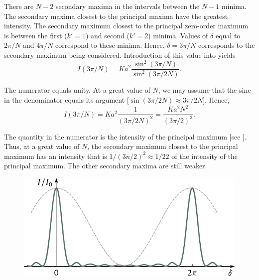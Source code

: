 \noindent
There are $N-2$ secondary maxima in the intervals between the $N-1$ minima.
The secondary maxima closest to the principal maxima have the greatest intensity.
The secondary maximum closest to the principal zero-order maximum is between the first ($k'=1$) and second ($k'=2$) minima.
Values of $\delta$ equal to $2\pi/N$ and $4\pi/N$ correspond to these minima.
Hence, $\delta=3\pi/N$ corresponds to the secondary maximum being considered.
Introduction of this value into  yields
\begin{equation*}
    I(3\pi/N) = K a^2 \frac{ \sin^2(3\pi/N) }{ \sin^2(3\pi/2N) }.
\end{equation*}

\noindent
The numerator equals unity.
At a great value of $N$, we may assume that the sine in the denominator equals its argument [$\sin(3\pi/2N)\approx 3\pi/2N$].
Hence,
\begin{equation*}
    I(3\pi/N) = K a^2 \frac{1}{ (3\pi/2N)^2 } = \frac{K a^2 N^2}{(3\pi/2)^2}.
\end{equation*}

\noindent
The quantity in the numerator is the intensity of the principal maximum [see ].
Thus, at a great value of $N$, the secondary maximum closest to the principal maximum has an intensity that is $1/(3n/2)^2\approx 1/22$ of the intensity of the principal maximum.
The other secondary maxima are still weaker.

\begin{figure}[t]
	\begin{center}
		\includegraphics[scale=0.95]{figures/ch_17/fig_17_18.pdf}
		\caption[]{}
		\label{fig:17_18}
	\end{center}
	\vspace{-0.85cm}
\end{figure}

